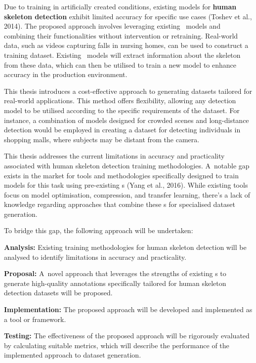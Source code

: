 Due to training in artificially created conditions, existing models for {\bf human skeleton detection} exhibit limited accuracy for specific use cases (\scc Toshev et al., 2014). The proposed approach involves leveraging existing \NN\ models and combining their functionalities without intervention or retraining. Real-world data, such as videos capturing falls in nursing homes, can be used to construct a training dataset. Existing \NN\ models will extract information about the skeleton from these data, which can then be utilised to train a new model to enhance accuracy in the production environment.

This thesis introduces a cost-effective approach to generating datasets tailored for real-world applications. This method offers flexibility, allowing any detection model to be utilised according to the specific requirements of the dataset. For instance, a combination of models designed for crowded scenes and long-distance detection would be employed in creating a dataset for detecting individuals in shopping malls, where subjects may be distant from the camera.

This thesis addresses the current limitations in accuracy and practicality associated with human skeleton detection training methodologies. A~notable gap exists in the market for tools and methodologies specifically designed to train models for this task using pre-existing \NN\-s (\scc Yang et al., 2016). While existing tools focus on model optimisation, compression, and transfer learning, there's a lack of knowledge regarding approaches that combine these \NN\-s for specialised dataset generation.

To bridge this gap, the following approach will be undertaken:

\startitemize[n]
 \item {\bf Analysis:} Existing training methodologies for human skeleton detection will be analysed to identify limitations in accuracy and practicality.
 \item {\bf Proposal:} A~novel approach that leverages the strengths of existing \NN\-s to generate high-quality annotations specifically tailored for human skeleton detection datasets will be proposed.
 \item {\bf Implementation:} The proposed approach will be developed and implemented as a tool or framework.
 \item {\bf Testing:} The effectiveness of the proposed approach will be rigorously evaluated by calculating suitable metrics, which will describe the performance of the implemented approach to dataset generation.
\stopitemize